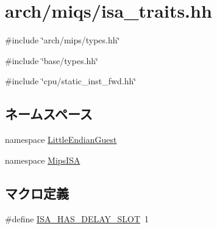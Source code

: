\hypertarget{miqs_2isa__traits_8hh}{
\section{arch/miqs/isa\_\-traits.hh}
\label{miqs_2isa__traits_8hh}
}
{\ttfamily \#include \char`\"{}arch/mips/types.hh\char`\"{}}\par
{\ttfamily \#include \char`\"{}base/types.hh\char`\"{}}\par
{\ttfamily \#include \char`\"{}cpu/static\_\-inst\_\-fwd.hh\char`\"{}}\par
\subsection*{ネームスペース}
\begin{DoxyCompactItemize}
\item 
namespace \hyperlink{namespaceLittleEndianGuest}{LittleEndianGuest}
\item 
namespace \hyperlink{namespaceMipsISA}{MipsISA}
\end{DoxyCompactItemize}
\subsection*{マクロ定義}
\begin{DoxyCompactItemize}
\item 
\#define \hyperlink{miqs_2isa__traits_8hh_aae21ac6833454e7ead9810c372658afc}{ISA\_\-HAS\_\-DELAY\_\-SLOT}~1
\end{DoxyCompactItemize}
